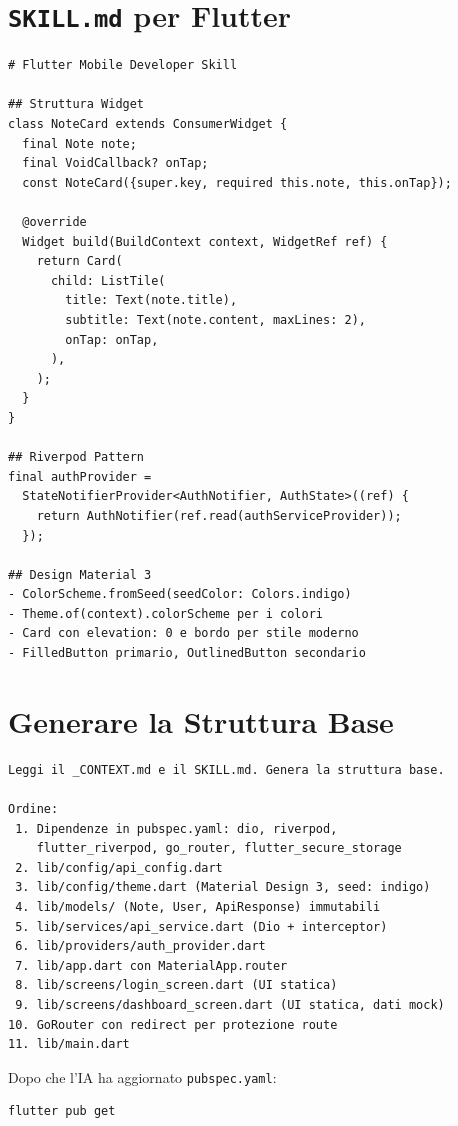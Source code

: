 \section{\texttt{SKILL.md} per Flutter}

\begin{lstlisting}[language={},title={\texttt{SKILL.md} --- Flutter Mobile Developer}]
# Flutter Mobile Developer Skill

## Struttura Widget
class NoteCard extends ConsumerWidget {
  final Note note;
  final VoidCallback? onTap;
  const NoteCard({super.key, required this.note, this.onTap});

  @override
  Widget build(BuildContext context, WidgetRef ref) {
    return Card(
      child: ListTile(
        title: Text(note.title),
        subtitle: Text(note.content, maxLines: 2),
        onTap: onTap,
      ),
    );
  }
}

## Riverpod Pattern
final authProvider =
  StateNotifierProvider<AuthNotifier, AuthState>((ref) {
    return AuthNotifier(ref.read(authServiceProvider));
  });

## Design Material 3
- ColorScheme.fromSeed(seedColor: Colors.indigo)
- Theme.of(context).colorScheme per i colori
- Card con elevation: 0 e bordo per stile moderno
- FilledButton primario, OutlinedButton secondario
\end{lstlisting}

\section{Generare la Struttura Base}

\begin{praticabox}[title={Pratica --- Genera l'app con Copilot}]
\begin{lstlisting}[language={}]
Leggi il _CONTEXT.md e il SKILL.md. Genera la struttura base.

Ordine:
 1. Dipendenze in pubspec.yaml: dio, riverpod,
    flutter_riverpod, go_router, flutter_secure_storage
 2. lib/config/api_config.dart
 3. lib/config/theme.dart (Material Design 3, seed: indigo)
 4. lib/models/ (Note, User, ApiResponse) immutabili
 5. lib/services/api_service.dart (Dio + interceptor)
 6. lib/providers/auth_provider.dart
 7. lib/app.dart con MaterialApp.router
 8. lib/screens/login_screen.dart (UI statica)
 9. lib/screens/dashboard_screen.dart (UI statica, dati mock)
10. GoRouter con redirect per protezione route
11. lib/main.dart
\end{lstlisting}
Dopo che l'IA ha aggiornato \texttt{pubspec.yaml}:
\begin{lstlisting}[language=bash]
flutter pub get
\end{lstlisting}
\end{praticabox}

